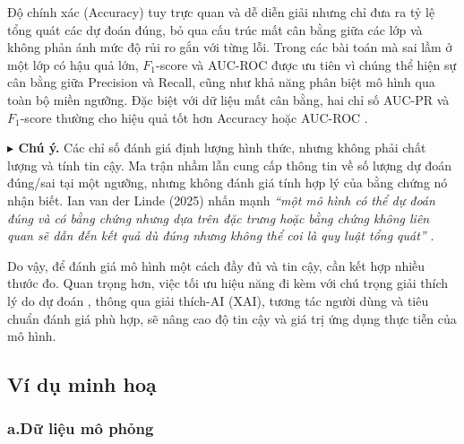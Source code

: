 \documentclass[a4paper,oneside]{book} %
\theoremstyle{plain}
\theoremstyle{plain}
\theoremstyle{nonumberplain}
\newcommand{\chy}[1]{\begin{remark}#1\end{remark}}
\begin{document}
\chy{
	 Độ chính xác (Accuracy) tuy trực quan và dễ diễn giải nhưng chỉ đưa ra tỷ lệ tổng quát các dự đoán đúng, bỏ qua cấu trúc mất cân bằng giữa các lớp và không phản ánh mức độ rủi ro gắn với từng lỗi. Trong các bài toán mà sai lầm ở một lớp có hậu quả lớn, $F_1$-score và AUC-ROC được ưu tiên vì chúng thể hiện sự cân bằng giữa Precision và Recall, cũng như khả năng phân biệt mô hình qua toàn bộ miền ngưỡng. Đặc biệt với dữ liệu mất cân bằng, hai chỉ số AUC-PR và $F_1$-score thường cho hiệu quả tốt hơn Accuracy hoặc AUC-ROC \cite{ghanem2023limitations}.
}

\textbf{$\blacktriangleright$ Chú ý.} 
Các chỉ số đánh giá định lượng hình thức, nhưng không phải chất lượng và tính tin cậy. Ma trận nhầm lẫn cung cấp thông tin về số lượng dự đoán đúng/sai tại một ngưỡng, nhưng không đánh giá tính hợp lý của bằng chứng nó nhận biết. Ian van der Linde (2025) nhấn mạnh \emph{``một mô hình có thể dự đoán đúng và có bằng chứng nhưng dựa trên đặc trưng hoặc bằng chứng không liên quan sẽ dẫn đến kết quả dù đúng nhưng không thể coi là quy luật tổng quát''} \cite{van2025confusion}.  

Do vậy, để đánh giá mô hình một cách đầy đủ và tin cậy, cần kết hợp nhiều thước đo. Quan trọng hơn, việc tối ưu hiệu năng đi kèm với chú trọng giải thích lý do dự đoán \cite{erasmus2021interpretability,herm2023stop}, thông qua giải thích-AI (XAI), tương tác người dùng và tiêu chuẩn đánh giá phù hợp, sẽ nâng cao độ tin cậy và giá trị ứng dụng thực tiễn của mô hình.






\subsection{Ví dụ minh hoạ}



\subsubsection{a.\quad Dữ liệu mô phỏng}
\end{document}
